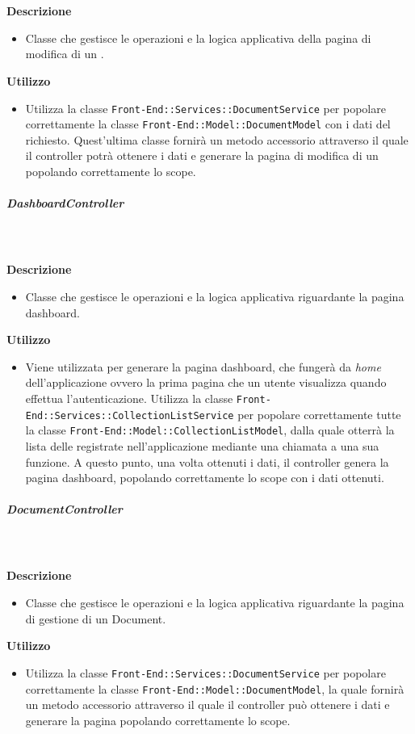         \textbf{\\ \\ Descrizione} 
          \begin{itemize}
            \item[] Classe che gestisce le operazioni e la logica applicativa della pagina di modifica di un .
          \end{itemize}      
        \textbf{Utilizzo}  
          \begin{itemize}
            \item[] Utilizza la classe \texttt{Front-End::Services::DocumentService} per popolare correttamente la classe \texttt{Front-End::Model::DocumentModel} con i dati del  richiesto. Quest'ultima classe fornirà un metodo accessorio attraverso il quale il controller potrà ottenere i dati e generare la pagina di modifica di un  popolando correttamente lo scope.
          \end{itemize}
      \subparagraph{DashboardController}
        
        \textbf{\\ \\ Descrizione} 
          \begin{itemize}
            \item[] Classe che gestisce le operazioni e la logica applicativa riguardante la pagina dashboard.
          \end{itemize}      
        \textbf{Utilizzo}  
          \begin{itemize}
            \item[] Viene utilizzata per generare la pagina dashboard, che fungerà da \textit{home} dell'applicazione ovvero la prima pagina che un utente visualizza quando effettua l'autenticazione. Utilizza la classe \texttt{Front-End::Services::CollectionListService} per popolare correttamente tutte la classe \texttt{Front-End::Model::CollectionListModel}, dalla quale otterrà la lista delle  registrate nell'applicazione mediante una chiamata a una sua funzione. A questo punto, una volta ottenuti i dati, il controller genera la pagina dashboard, popolando correttamente lo scope con i dati ottenuti.
          \end{itemize}
      \subparagraph{DocumentController}
        
        \textbf{\\ \\ Descrizione} 
          \begin{itemize}
            \item[] Classe che gestisce le operazioni e la logica applicativa riguardante la pagina di gestione di un Document.
          \end{itemize}      
        \textbf{Utilizzo}  
          \begin{itemize}
            \item[] Utilizza la classe \texttt{Front-End::Services::DocumentService} per popolare correttamente la classe \texttt{Front-End::Model::DocumentModel}, la quale fornirà un metodo accessorio attraverso il quale il controller può ottenere i dati e generare la pagina popolando correttamente lo scope.
          \end{itemize}
